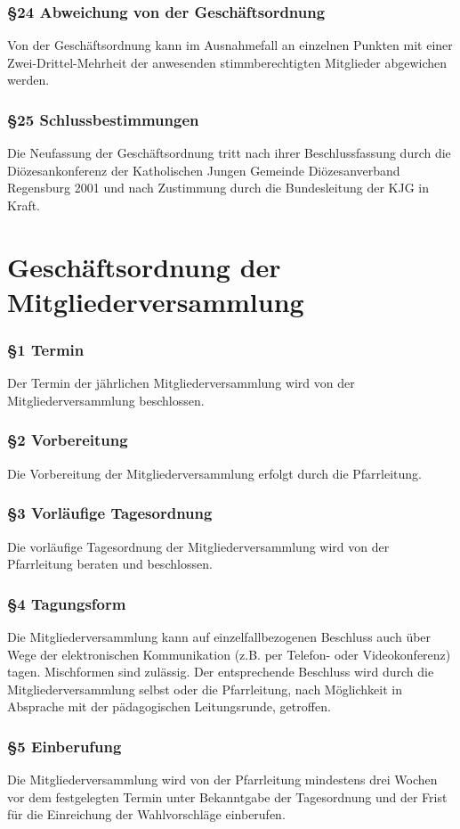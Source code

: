 \documentclass[12pt]{report}
\begin{document}
\begin{justify}
\subsection*{§24 Abweichung von der Geschäftsordnung}
Von der Geschäftsordnung kann im Ausnahmefall an einzelnen Punkten mit einer Zwei-Drittel-Mehrheit der
anwesenden stimmberechtigten Mitglieder abgewichen werden.
\subsection*{§25 Schlussbestimmungen}
Die Neufassung der Geschäftsordnung tritt nach ihrer Beschlussfassung durch die Diözesankonferenz der
Katholischen Jungen Gemeinde Diözesanverband Regensburg 2001 und nach Zustimmung durch die Bundesleitung
der KJG in Kraft.

\chapter*{Geschäftsordnung der Mitgliederversammlung}

\subsection*{§1 Termin}
Der Termin der jährlichen Mitgliederversammlung wird von der Mitgliederversammlung beschlossen.
\subsection*{§2 Vorbereitung}
Die Vorbereitung der Mitgliederversammlung erfolgt durch die Pfarrleitung.
\subsection*{§3 Vorläufige Tagesordnung}
Die vorläufige Tagesordnung der Mitgliederversammlung wird von der Pfarrleitung beraten und beschlossen.
\subsection*{§4 Tagungsform}
Die Mitgliederversammlung kann auf einzelfallbezogenen Beschluss auch über Wege der elektronischen Kommunikation (z.B. per Telefon- oder Videokonferenz) tagen. Mischformen sind zulässig. Der entsprechende Beschluss wird durch die Mitgliederversammlung selbst oder die Pfarrleitung, nach Möglichkeit in Absprache mit der pädagogischen Leitungsrunde, getroffen.
\subsection*{§5 Einberufung}
Die Mitgliederversammlung wird von der Pfarrleitung mindestens drei Wochen vor dem festgelegten Termin
unter Bekanntgabe der Tagesordnung und der Frist für die Einreichung der Wahlvorschläge einberufen.

\end{justify}
\end{document}
